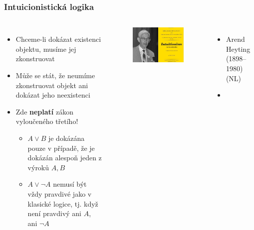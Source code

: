 \documentclass[aspectratio=169]{beamer}
\begin{document}
\begin{frame}
\frametitle{Intuicionistická logika}
\begin{columns}
\begin{itemize}
\item Chceme-li dokázat existenci objektu, musíme jej zkonstruovat
\item Může se stát, že neumíme zkonstruovat objekt ani dokázat jeho neexistenci
\item Zde \textbf{neplatí} zákon vyloučeného třetího!
    \begin{itemize}
    \item $A \lor B$ je dokázána pouze v případě, že je dokázán alespoň jeden z výroků $A, B$
    \item $A \lor \neg A$ nemusí být vždy pravdivé jako v klasické logice, tj. když není pravdivý ani $A$, ani $\neg A$
    \end{itemize}
\end{itemize}

\begin{figure}
\includegraphics[scale=0.45]{heyting}
\end{figure}
\small
\begin{itemize}
\item Arend Heyting (1898--1980) (NL)
\item {}
\end{itemize}
\end{columns}
\end{frame}
\end{document}
